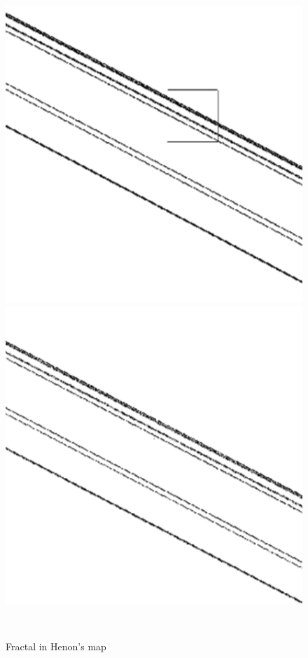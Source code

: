 \documentclass[12pt]{article}
\theoremstyle{plain}
\begin{document}
\begin{figure}[H]
\begin{minipage}[c][0.23\width]{
   0.23\textwidth}
\end{minipage}
\begin{minipage}[c][0.23\width]{
   0.23\textwidth}
   \centering
   \includegraphics[width=1\textwidth]{figure/section4/Henon-self-similar-02.png}
\end{minipage}
\begin{minipage}[c][0.23\width]{
   0.23\textwidth}
   \centering
   \includegraphics[width=1\textwidth]{figure/section4/Henon-self-similar-03.png}
\end{minipage}
\\[5ex]\caption{Fractal in Henon's map}\label{Fractal-henon}
\end{figure}
\end{document}
